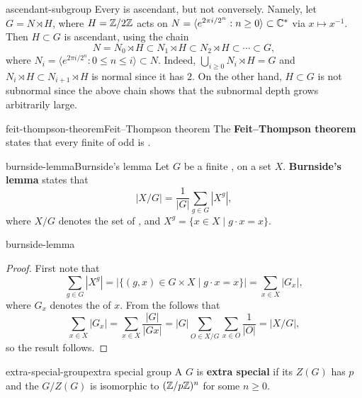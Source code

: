 \begin{example}{ascendant-subgroup}
    Every  is ascendant, but not conversely. Namely, let $G = N \rtimes H$, where $H = \mathbb{Z}/2\mathbb{Z}$ acts on $N = \langle e^{2 \pi i / 2^n} : n \ge 0 \rangle \subset \mathbb{C}^*$ via $x \mapsto x^{-1}$. Then $H \subset G$ is ascendant, using the chain
    \[ N = N_0 \rtimes H \subset N_1 \rtimes H \subset N_2 \rtimes H \subset \cdots \subset G , \]
    where $N_i = \langle e^{2 \pi i / 2^n} : 0 \le n \le i \rangle \subset N$. Indeed, $\bigcup_{i \ge 0} N_i \rtimes H = G$ and $N_i \rtimes H \subset N_{i + 1} \rtimes H$ is normal since it has  $2$. On the other hand, $H \subset G$ is not subnormal since the above chain shows that the subnormal depth grows arbitrarily large.
\end{example}

\begin{topic}{feit-thompson-theorem}{Feit--Thompson theorem}
    The \textbf{Feit--Thompson theorem} states that every finite  of odd  is .
\end{topic}

\begin{topic}{burnside-lemma}{Burnside's lemma}
    Let $G$ be a finite ,  on a set $X$. \textbf{Burnside's lemma} states that
    \[ |X/G| = \frac{1}{|G|} \sum_{g \in G} |X^g| , \]
    where $X/G$ denotes the set of , and $X^g = \{ x \in X \mid g \cdot x = x \}$.
\end{topic}

\begin{example}{burnside-lemma}
    \begin{proof}
        First note that
        \[ \sum_{g \in G} |X^g| = |\{ (g, x) \in G \times X \mid g \cdot x = x \}| = \sum_{x \in X} |G_x| , \]
        where $G_x$ denotes the  of $x$. From the  follows that
        \[ \sum_{x \in X} |G_x| = \sum_{x \in X} \frac{|G|}{|G x|} = |G| \sum_{O \in X/G} \sum_{x \in O} \frac{1}{|O|} = |X/G| , \]
        so the result follows.
    \end{proof}
\end{example}

\begin{topic}{extra-special-group}{extra special group}
    A  $G$ is \textbf{extra special} if its  $Z(G)$ has  $p$ and the  $G / Z(G)$ is isomorphic to $(\mathbb{Z} / p \mathbb{Z})^n$ for some $n \ge 0$.
\end{topic}

